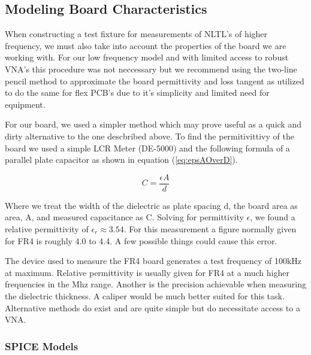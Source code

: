 \documentclass[journal]{IEEEtran} \usepackage[english]{babel}
\begin{document}
    
    
   

\subsection{Modeling Board Characteristics}\label{sub:BoardModeling}

When constructing a test fixture for measurements of NLTL's of higher frequency,
we must also take into account the properties of the board we are working with.
For our low frequency model and with limited access to robust VNA's this
procedure was not neccessary but we recommend using the two-line pencil
method to approximate the board permittivity and loss tangent as utilized to do
the same for flex PCB's due to it's simplicity and limited need for
equipment\cite{TwoLine}.

For our board, we used a simpler method which may prove useful as a quick and
dirty alternative to the one descbribed above. To find the permitivittivy of the
board we used a simple LCR Meter (DE-5000) and the following formula of a
parallel plate capacitor as shown in equation (\ref{eq:epsAOverD}).



\begin{equation}\label{eq:epsAOverD}
	C =\frac{ \epsilon{}A }{d}
\end{equation}

Where we treat the width of the dielectric as plate spacing d, the board area
as area, A, and measured capacitance as C. Solving for permittivity
$\epsilon$, we found a relative permittivity of $\epsilon_{r}\approx 3.54$.
For this measurement a figure normally given for FR4 is roughly 4.0 to 4.4. A
few possible things could cause this error. 

The device used to measure the FR4 board generates a test frequency of 100kHz at
maximum. Relative permittivity is usually given for FR4 at a much higher
frequencies in the Mhz range. Another is the precision achievable when measuring
the dielectric thickness. A caliper would be much better suited for this task.
Alternative methods do exist and are quite simple but do necessitate access to a
VNA\cite{SimpleRelative}.



    
\subsubsection{SPICE Models}\label{subsub:SPICE}
\end{document}
